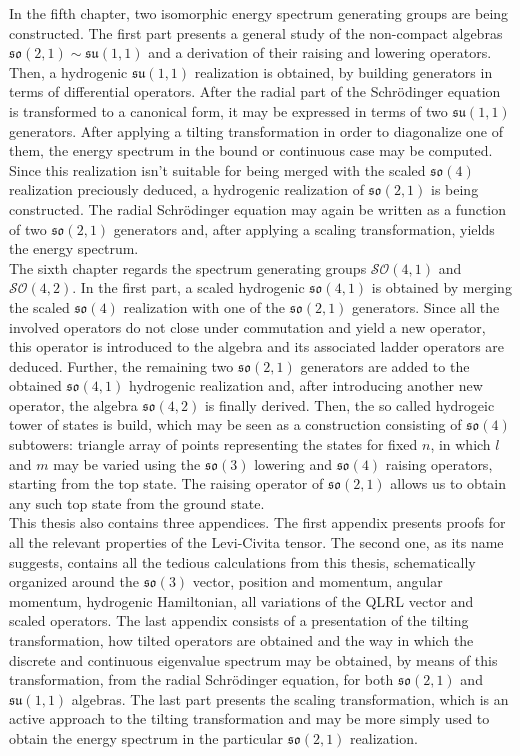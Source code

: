 \documentclass[12pt,a4paper]{report}
\theoremstyle{definition}
\theoremstyle{remark}
\theoremstyle{remark}
\begin{document}
In the fifth chapter, two isomorphic energy spectrum generating groups are being constructed. The first part presents a general study of the non-compact algebras $\mathfrak{so}(2,1)\sim\mathfrak{su}(1,1)$ and a derivation of their raising and lowering operators. Then, a hydrogenic $\mathfrak{su}(1,1)$ realization is obtained, by building generators in terms of differential operators. After the radial part of the Schrödinger equation is transformed to a canonical form, it may be expressed in terms of two $\mathfrak{su}(1,1)$ generators. After applying a tilting transformation in order to diagonalize one of them, the energy spectrum in the bound or continuous case may be computed. Since this realization isn't suitable for being merged with the scaled $\mathfrak{so}(4)$ realization preciously deduced, a hydrogenic realization of $\mathfrak{so}(2,1)$ is being constructed. The radial Schrödinger equation may again be written as a function of two $\mathfrak{so}(2,1)$ generators and, after applying a scaling transformation, yields the energy spectrum. \\ \indent
The sixth chapter regards the spectrum generating groups $\mathcal{SO}(4,1)$ and $\mathcal{SO}(4,2)$. In the first part, a scaled hydrogenic $\mathfrak{so}(4,1)$ is obtained by merging the scaled $\mathfrak{so}(4)$ realization with one of the $\mathfrak{so}(2,1)$ generators. Since all the involved operators do not close under commutation and yield a new operator, this operator is introduced to the algebra and its associated ladder operators are deduced. Further, the remaining two $\mathfrak{so}(2,1)$ generators are added to the obtained $\mathfrak{so}(4,1)$ hydrogenic realization and, after introducing another new operator, the algebra $\mathfrak{so}(4,2)$ is finally derived. Then, the so called hydrogeic tower of states is build, which may be seen as a construction consisting of $\mathfrak{so}(4)$ subtowers: triangle array of points representing the states for fixed $n$, in which $l$ and $m$ may be varied using the $\mathfrak{so(3)}$ lowering and $\mathfrak{so}(4)$ raising operators, starting from the top state. The raising operator of $\mathfrak{so}(2,1)$ allows us to obtain any such top state from the ground state. \\ \indent
This thesis also contains three appendices. The first appendix presents proofs for all the relevant properties of the Levi-Civita tensor. The second one, as its name suggests, contains all the tedious calculations from this thesis, schematically organized around the $\mathfrak{so}(3)$ vector, position and momentum, angular momentum, hydrogenic Hamiltonian, all variations of the QLRL vector and scaled operators. The last appendix consists of a presentation of the tilting transformation, how tilted operators are obtained and the way in which the discrete and continuous eigenvalue spectrum may be obtained, by means of this transformation, from the radial Schrödinger equation, for both $\mathfrak{so}(2,1)$ and $\mathfrak{su}(1,1)$ algebras. The last part presents the scaling transformation, which is an active approach to the tilting transformation and may be more simply used to obtain the energy spectrum in the particular $\mathfrak{so}(2,1)$ realization.
\end{document}
